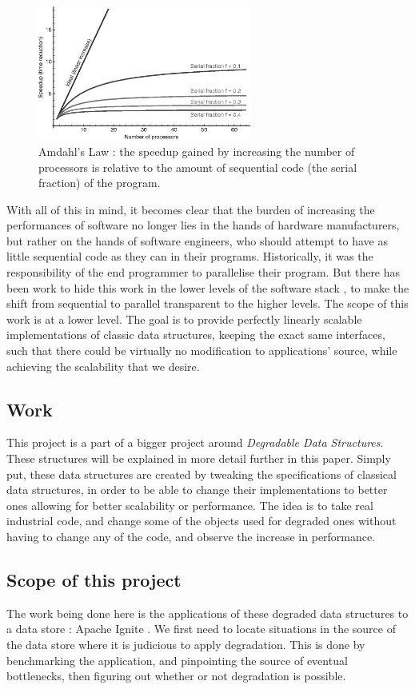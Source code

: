 \documentclass[conference]{IEEEtran}
\begin{document}
\begin{figure}[!ht]
\centerline{\includegraphics[width=70mm]{amdahl.png}}
\caption{Amdahl's Law : the speedup gained by increasing the number of processors is relative to the amount of sequential code (the serial fraction) of the program.}
\label{amdahl}
\end{figure}

With all of this in mind, it becomes clear that the burden of increasing the performances of software no longer lies in the hands of hardware manufacturers, but rather on the hands of software engineers, who should attempt to have as little sequential code as they can in their programs.
Historically, it was the responsibility of the end programmer to parallelise their program. But there has been work to hide this work in the lower levels of the software stack \cite{scalable}, to make the shift from sequential to parallel transparent to the higher levels. The scope of this work is at a lower level. The goal is to provide perfectly linearly scalable implementations of classic data structures, keeping the exact same interfaces, such that there could be virtually no modification to applications' source, while achieving the scalability that we desire.


\subsection{Work}
This project is a part of a bigger project around \textit{Degradable Data Structures}. These structures will be explained in more detail further in this paper. Simply put, these data structures are created by tweaking the specifications of classical data structures, in order to be able to change their implementations to better ones allowing for better scalability or performance. The idea is to take real industrial code, and change some of the objects used for degraded ones without having to change any of the code, and observe the increase in performance.

\subsection{Scope of this project}
The work being done here is the applications of these degraded data structures to a data store : Apache Ignite \cite{ignite}. We first need to locate situations in the source of the data store where it is judicious to apply degradation. This is done by benchmarking the application, and pinpointing the source of eventual bottlenecks, then figuring out whether or not degradation is possible.
\end{document}
